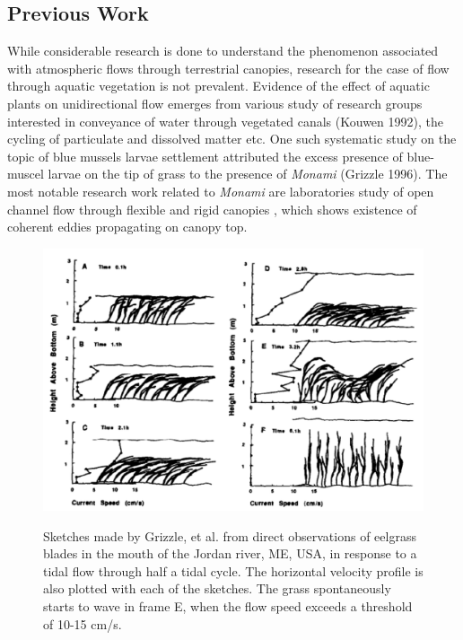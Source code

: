 \documentclass[12pt]{report}   %
\begin{document}
\subsection{Previous Work}
While considerable research is done to understand the phenomenon associated with atmospheric flows through terrestrial canopies, research for the case of flow through aquatic vegetation is not prevalent. Evidence of the effect of aquatic plants on unidirectional flow emerges from various study of research groups interested in conveyance of water through vegetated canals (Kouwen 1992), the cycling of particulate and dissolved matter etc. One such systematic study on the topic of blue mussels larvae settlement attributed the excess presence of blue-muscel larvae on the tip of grass to the presence of \textit{Monami} (Grizzle 1996). The most notable research work related to \textit{Monami} are laboratories study of open channel flow through flexible and rigid canopies \cite{Nepf00,Ikedea}, which shows existence of coherent eddies propagating on canopy top. 
\begin{figure}
 {\includegraphics[scale=0.72]{Grizzle}}
 \caption{Sketches made by Grizzle, et al. \citep{Grizzle96} from direct observations of eelgrass blades in the mouth of the Jordan river, ME, USA, in response to a tidal
 flow through half a tidal cycle. The horizontal velocity profile is also plotted with each of the sketches. The grass spontaneously starts to wave in frame E, when the flow 
 speed exceeds a threshold of 10-15 cm/s.}
\end{figure}
\end{document}
